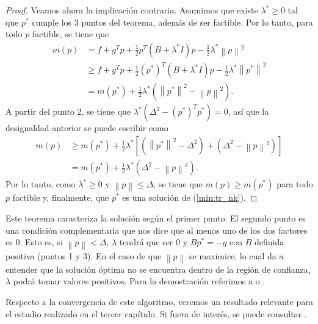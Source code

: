 \documentclass[11pt,a4paper]{book}
\theoremstyle{definition}
\theoremstyle{remark}
\newcommand{\norm}[1]{\left\lVert#1\right\rVert}
\begin{document}
\begin{proof}
Veamos ahora la implicación contraria. Asumimos que existe $\lambda^* \geq 0$ tal que $p^*$ cumple los 3 puntos del teorema, además de ser factible. Por lo tanto, para todo $p$ factible, se tiene que
\begin{equation}
	\begin{split}
		m(p) & = f + g^Tp + \frac{1}{2}p^T(B+\lambda^* I)p - \frac{1}{2}\lambda^* \norm{p}^2 \\
		& \geq f + g^Tp + \frac{1}{2}(p^*)^T(B+\lambda^* I)p - \frac{1}{2}\lambda^* \norm{p^*}^2 \\
		& = m(p^*) + \frac{1}{2} \lambda^* \left(\norm{p^*}^2-\norm{p}^2 \right).
	\end{split}
\end{equation}
A partir del punto 2, se tiene que $\lambda^* (\Delta^2 - (p^*)^Tp^*) = 0$, así que la desigualdad anterior se puede
escribir como
\begin{equation}
	\begin{split}
		m(p) & \geq m(p^*) + \frac{1}{2} \lambda^*
		\left[ \left(\norm{p^*}^2-\Delta^2 \right) + \left(\Delta^2 - \norm{p}^2 \right) \right]\\
		& = m(p^*) + \frac{1}{2} \lambda^* \left(\Delta^2 - \norm{p}^2 \right).
	\end{split}
\end{equation}
Por lo tanto, como $\lambda^* \geq 0$ y $\norm{p} \leq \Delta$, se tiene que $m(p) \geq m(p^*)$ para todo $p$ factible y, finalmente, que $p^*$ es una solución de (\ref{min:tr_nk}).

\end{proof}

Este teorema caracteriza la solución según el primer punto. El segundo punto es una condición complementaria que nos dice que al menos uno de los dos factores es 0.
Esto es, si $\norm{p}<\Delta$, $\lambda$ tendrá que ser 0 y $Bp^*=-g$ con $B$ definida positiva (puntos 1 y 3).
En el caso de que $\norm{p}$ se maximice, lo cual da a entender que la solución óptima no se encuentra dentro de la región de confianza, $\lambda$ podrá tomar valores positivos.
Para la demostración referimos a \cite[Sección 4.3]{Nocedal2006-kh} o \cite[Teorema 6.1]{Sun2006-au}.

Respecto a la convergencia de este algoritmo, veremos un resultado relevante para el estudio realizado en el
tercer capítulo.
Si fuera de interés, se puede consultar \cite[Sección 6.1.2]{Sun2006-au}.

\end{document}
